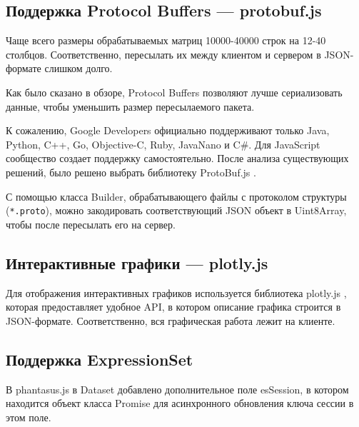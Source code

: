 \documentclass[annotation,specification]{itmo-student-thesis}
\begin{document}
\subsection{Поддержка Protocol Buffers --- protobuf.js}
Чаще всего размеры обрабатываемых матриц 10000-40000 строк на 12-40 столбцов. Соответственно, пересылать их между клиентом и сервером в JSON-формате слишком долго.

Как было сказано в обзоре, Protocol Buffers позволяют лучше сериализовать данные, чтобы уменьшить размер пересылаемого пакета.

К сожалению, Google Developers официально поддерживают только Java, Python, C++, Go, Objective-C, Ruby, JavaNano и C\#. Для JavaScript сообщество создает поддержку самостоятельно. После анализа существующих решений, было решено выбрать библиотеку ProtoBuf.js \cite{protobufjs}.

С помощью класса Builder, обрабатывающего файлы с протоколом структуры (\texttt{*.proto}), можно закодировать соответствующий JSON объект в Uint8Array, чтобы после пересылать его на сервер.

\subsection{Интерактивные графики --- plotly.js}
Для отображения интерактивных графиков используется библиотека plotly.js \cite{plotly}, которая предоставляет удобное API, в котором описание графика строится в JSON-формате. Соответственно, вся графическая работа лежит на клиенте.

\subsection{Поддержка ExpressionSet}
В phantasus.js в Dataset добавлено дополнительное поле esSession, в котором находится объект класса Promise для асинхронного обновления ключа сессии в этом поле.
\end{document}
